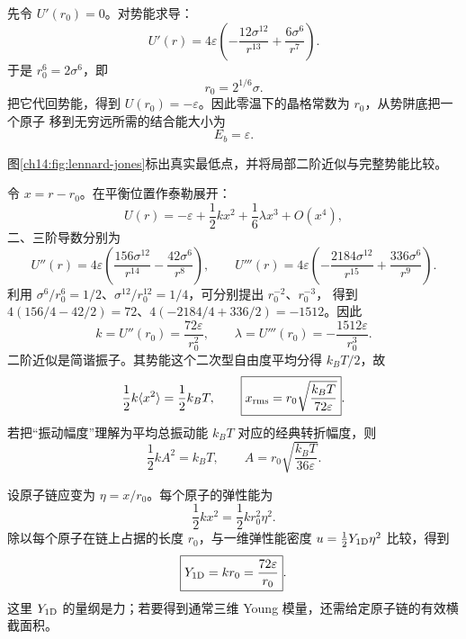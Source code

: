 \begin{xesolution}
先令 $U'(r_0)=0$。对势能求导：
\begin{equation}
  U'(r)=4\varepsilon\left(-\frac{12\sigma^{12}}{r^{13}}
  +\frac{6\sigma^6}{r^7}\right).
\end{equation}
于是 $r_0^6=2\sigma^6$，即
\begin{equation}
  \boxed{r_0=2^{1/6}\sigma}.
\end{equation}
把它代回势能，得到 $U(r_0)=-\varepsilon$。因此零温下的晶格常数为 $r_0$，从势阱底把一个原子
移到无穷远所需的结合能大小为
\begin{equation}
  \boxed{E_b=\varepsilon}.
\end{equation}

图\ref{ch14:fig:lennard-jones}标出真实最低点，并将局部二阶近似与完整势能比较。
\lennardJonesDiagram

令 $x=r-r_0$。在平衡位置作泰勒展开：
\begin{equation}
  U(r)=-\varepsilon+\frac12kx^2+\frac16\lambda x^3+O(x^4),
\end{equation}
二、三阶导数分别为
\[
 U''(r)=4\varepsilon\left(\frac{156\sigma^{12}}{r^{14}}-\frac{42\sigma^6}{r^8}\right),\qquad
 U'''(r)=4\varepsilon\left(-\frac{2184\sigma^{12}}{r^{15}}+\frac{336\sigma^6}{r^9}\right).
\]
利用 $\sigma^6/r_0^6=1/2$、$\sigma^{12}/r_0^{12}=1/4$，可分别提出 $r_0^{-2}$、$r_0^{-3}$，
得到 $4(156/4-42/2)=72$、$4(-2184/4+336/2)=-1512$。因此
\begin{equation}
  \boxed{k=U''(r_0)=\frac{72\varepsilon}{r_0^2}},
  \qquad
  \boxed{\lambda=U'''(r_0)=-\frac{1512\varepsilon}{r_0^3}}.
\end{equation}
二阶近似是简谐振子。其势能这个二次型自由度平均分得 $k_BT/2$，故
\begin{equation}
  \frac12k\langle x^2\rangle=\frac12k_BT,
  \qquad
  \boxed{x_{\rm rms}=r_0\sqrt{\frac{k_BT}{72\varepsilon}}}.
\end{equation}
若把“振动幅度”理解为平均总振动能 $k_BT$ 对应的经典转折幅度，则
\begin{equation}
  \frac12kA^2=k_BT,\qquad
  \boxed{A=r_0\sqrt{\frac{k_BT}{36\varepsilon}}}.
\end{equation}

设原子链应变为 $\eta=x/r_0$。每个原子的弹性能为
\begin{equation}
  \frac12kx^2=\frac12kr_0^2\eta^2.
\end{equation}
除以每个原子在链上占据的长度 $r_0$，与一维弹性能密度
$u=\tfrac12Y_{1\rm D}\eta^2$ 比较，得到
\begin{equation}
  \boxed{Y_{1\rm D}=kr_0=\frac{72\varepsilon}{r_0}}.
\end{equation}
这里 $Y_{1\rm D}$ 的量纲是力；若要得到通常三维 Young 模量，还需给定原子链的有效横截面积。


\end{xesolution}
